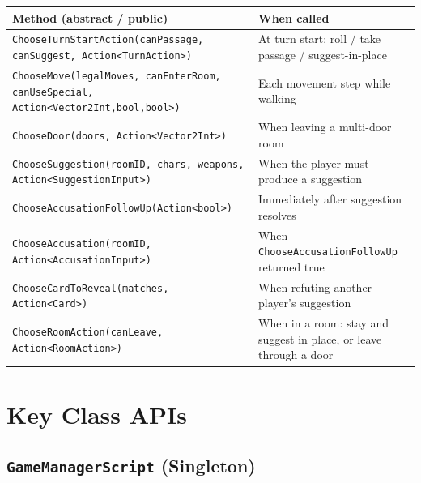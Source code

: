 \begin{table}[H]
\centering
\footnotesize
\setlength{\tabcolsep}{4pt}
\begin{tabular}{|p{5.2cm}|p{4.5cm}|}
\hline
\textbf{Method (abstract / public)} & \textbf{When called} \\ \hline
\texttt{ChooseTurnStart\-Action(\allowbreak canPassage, canSuggest, \allowbreak Action<TurnAction>)} & At turn start: roll / take passage / suggest-in-place \\ \hline
\texttt{ChooseMove(legal\-Moves, canEnterRoom, \allowbreak canUseSpecial, \allowbreak Action<Vector2Int,bool,\allowbreak bool>)} & Each movement step while walking \\ \hline
\texttt{ChooseDoor(doors, \allowbreak Action<Vector2Int>)} & When leaving a multi-door room \\ \hline
\texttt{ChooseSug\-gestion(roomID, \allowbreak chars, weapons, \allowbreak Action<Suggestion\-Input>)} & When the player must produce a suggestion \\ \hline
\texttt{ChooseAccusation\-FollowUp(\allowbreak Action<bool>)} & Immediately after suggestion resolves \\ \hline
\texttt{ChooseAccusation(\allowbreak roomID, Action<\allowbreak AccusationInput>)} & When \texttt{ChooseAccusationFollowUp} returned true \\ \hline
\texttt{ChooseCardToReveal(\allowbreak matches, Action<Card>)} & When refuting another player's suggestion \\ \hline
\texttt{ChooseRoomAction(\allowbreak canLeave, \allowbreak Action<RoomAction>)} & When in a room: stay and suggest in place, or leave through a door \\ \hline
\end{tabular}
\end{table}

\section{Key Class APIs}

\subsection*{\texttt{GameManagerScript} (Singleton)}

